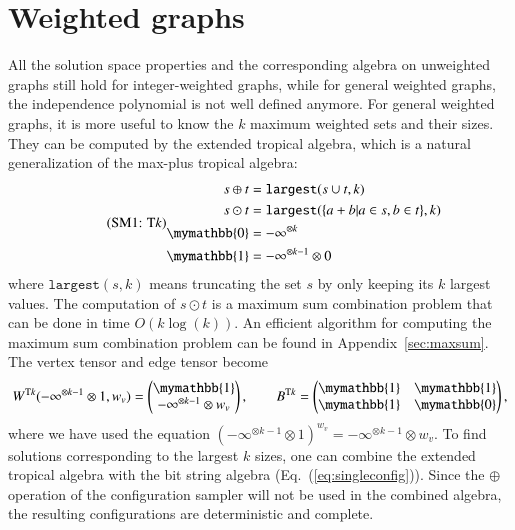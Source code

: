 \documentclass[onefignum, onetabnum]{siamart190516}
\newcommand{\eqname}[1]{\stepcounter{equation}\tag{\theequation : #1}}
\newcommand{\<}{\langle}
\renewcommand{\>}{\rangle}
\newcommand{\Eq}[1]{Eq.~(\ref{#1})}
\newcommand{\App}[1]{Appendix~\ref{#1}}
\begin{document}
\section{Weighted graphs}\label{sec:weighted}
All the solution space properties and the corresponding algebra on unweighted graphs still hold for integer-weighted graphs, while for general weighted graphs, the independence polynomial is not well defined anymore.
For general weighted graphs, it is more useful to know the $k$ maximum weighted sets and their sizes.
They can be computed by the extended tropical algebra, which is a natural generalization of the max-plus tropical algebra:
\begin{equation}
\eqname{T$k$}
\begin{split}
    s \oplus t &= \texttt{largest}(s \cup t, k)\\
    s \odot t &= \texttt{largest}(\{a+b | a \in s, b\in t\}, k)\\
    \mymathbb{0} &= -\infty^{\otimes k}\\
    \mymathbb{1} &= -\infty^{\otimes k-1} \otimes 0
\end{split}\label{eq:ext-tropical}
\end{equation}
where $\texttt{largest}(s, k)$ means truncating the set $s$ by only keeping its $k$ largest values.
The computation of $s \odot t$ is a maximum sum combination problem that can be done in time $O(k\log(k))$.
An efficient algorithm for computing the maximum sum combination problem can be found in \App{sec:maxsum}.
The vertex tensor and edge tensor become
\begin{equation}
    W^{{\rm T}k}(-\infty^{\otimes k-1} \otimes 1, w_v) = \left(\begin{matrix}
        \mymathbb{1} \\
        -\infty^{\otimes k-1} \otimes w_v
    \end{matrix}\right),   
    \qquad
        B^{{\rm T}k} = \left(\begin{matrix}
        \mymathbb{1}  & \mymathbb{1} \\
        \mymathbb{1} & \mymathbb{0}
    \end{matrix}\right),
\end{equation}
where we have used the equation $(-\infty^{\otimes k-1} \otimes 1)^{w_v} = -\infty^{\otimes k-1} \otimes w_v$.
To find solutions corresponding to the largest $k$ sizes, one can combine the extended tropical algebra with the bit string algebra (\Eq{eq:singleconfig}).
Since the $\oplus$ operation of the configuration sampler will not be used in the combined algebra, the resulting configurations are deterministic and complete.
\end{document}
